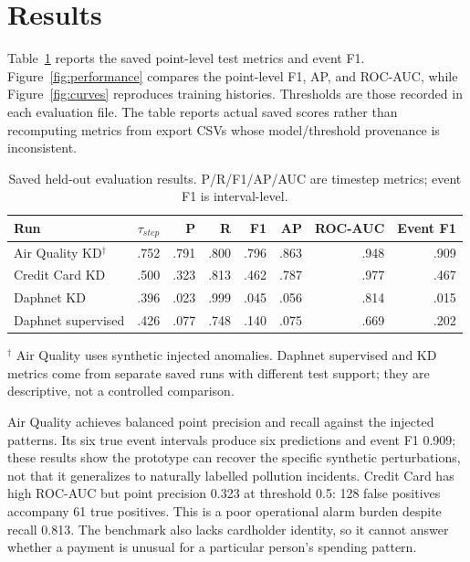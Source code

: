 \documentclass[twoside,english]{article}
\begin{document}
\section{Results} \label{sec:results}
Table~\ref{tab:results} reports the saved point-level test metrics and event F1. Figure~\ref{fig:performance} compares the point-level F1, AP, and ROC-AUC, while Figure~\ref{fig:curves} reproduces training histories. Thresholds are those recorded in each evaluation file. The table reports actual saved scores rather than recomputing metrics from export CSVs whose model/threshold provenance is inconsistent.

\begin{table}[t]
\centering
\caption{Saved held-out evaluation results. P/R/F1/AP/AUC are timestep metrics; event F1 is interval-level.}
\label{tab:results}
\small
\begin{tabular}{lrrrrrrr}
\toprule
Run & $\tau_{step}$ & P & R & F1 & AP & ROC-AUC & Event F1 \\
\midrule
Air Quality KD$^\dagger$ & .752 & .791 & .800 & .796 & .863 & .948 & .909 \\
Credit Card KD & .500 & .323 & .813 & .462 & .787 & .977 & .467 \\
Daphnet KD & .396 & .023 & .999 & .045 & .056 & .814 & .015 \\
Daphnet supervised & .426 & .077 & .748 & .140 & .075 & .669 & .202 \\
\bottomrule
\end{tabular}
\vspace{1mm}
\begin{minipage}{0.95\linewidth}\footnotesize $^\dagger$ Air Quality uses synthetic injected anomalies. Daphnet supervised and KD metrics come from separate saved runs with different test support; they are descriptive, not a controlled comparison.\end{minipage}
\end{table}

Air Quality achieves balanced point precision and recall against the injected patterns. Its six true event intervals produce six predictions and event F1 0.909; these results show the prototype can recover the specific synthetic perturbations, not that it generalizes to naturally labelled pollution incidents. Credit Card has high ROC-AUC but point precision 0.323 at threshold 0.5: 128 false positives accompany 61 true positives. This is a poor operational alarm burden despite recall 0.813. The benchmark also lacks cardholder identity, so it cannot answer whether a payment is unusual for a particular person's spending pattern.
\end{document}
